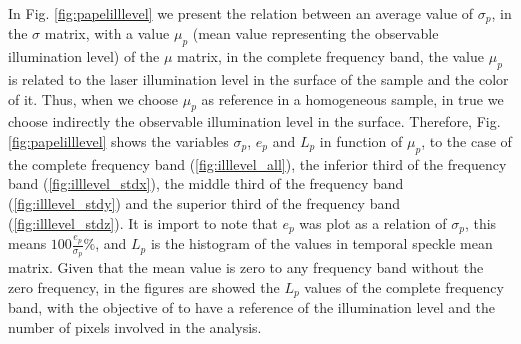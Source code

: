 \documentclass[review]{elsarticle}
\begin{document}
In Fig. \ref{fig:papelilllevel} we present the relation between an average value of $\sigma_p$,
in the $\sigma$ matrix, with a value $\mu_p$ (mean value representing the observable illumination level) of the $\mu$ matrix, 
in the complete frequency band, the value $\mu_p$
is related to the laser illumination level in the surface of the sample \cite{Nothdurft:05}
and the color of it. Thus, when we choose $\mu_p$  as reference 
in a homogeneous sample,  
in true we choose indirectly the observable illumination level in the surface.
Therefore, Fig. \ref{fig:papelilllevel} shows the variables $\sigma_p$, $e_p$ and $L_p$ in function
of  $\mu_p$, to the case of the complete frequency band (\ref{fig:illlevel_all}), 
the inferior third of the frequency band (\ref{fig:illlevel_stdx}),
the middle third of the frequency band (\ref{fig:illlevel_stdy}) 
and the superior third of the frequency band (\ref{fig:illlevel_stdz}). 
It is import to note that $e_p$ was plot as a relation of $\sigma_p$, this means  $100 \frac{e_p}{\sigma_p} \%$,
and $L_p$ is the histogram of the values in temporal speckle mean matrix.
Given that the mean value is zero to any frequency band without the zero frequency,
in the figures are showed the $L_p$ values of the complete frequency band, 
with the objective of to have a reference of the illumination level and the number of pixels involved in the analysis.
\end{document}
